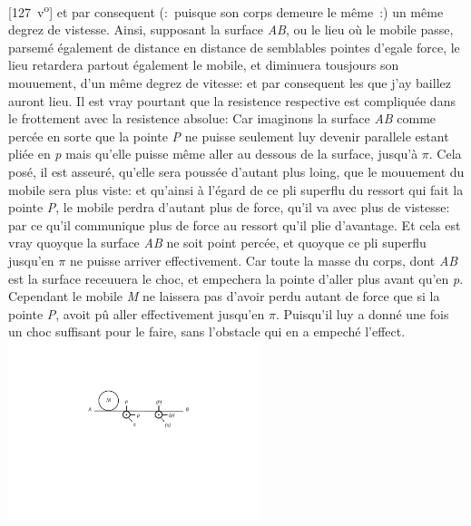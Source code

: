 [127~v\textsuperscript{o}] et par consequent (:~puisque son corps demeure le m\^{e}me~:) un m\^{e}me degrez de vistesse. Ainsi, supposant la surface \textit{AB}, ou le lieu o\`{u} le mobile passe, parsem\'{e} \'{e}galement de distance en distance de semblables pointes d'egale force, le lieu retardera partout \'{e}galement le mobile, et diminuera tousjours son mouuement, d'un m\^{e}me degrez de vitesse: et par consequent les  que j'ay baillez auront lieu.
\pend
\pstart
Il est vray pourtant que la resistence respective est compliqu\'{e}e dans le frottement avec la resistence absolue: Car imaginons la surface \textit{AB} comme perc\'{e}e en sorte que la pointe \textit{P} ne puisse seulement luy devenir parallele estant pli\'{e}e en \textit{p} mais qu'elle puisse m\^{e}me aller au dessous de la surface, jusqu'\`{a} $\pi$.
\pend
\pstart
Cela pos\'{e}, il est asseur\'{e}, qu'elle sera pouss\'{e}e d'autant plus loing, que le mouuement du mobile sera plus viste: et qu'ainsi \`{a} l'\'{e}gard de ce pli superflu du ressort qui fait la pointe \textit{P}, le mobile perdra d'autant plus de force, qu'il va avec plus de vistesse: par ce qu'il communique plus de force au ressort qu'il plie d'avantage. Et cela est vray quoyque la surface \textit{AB} ne soit point perc\'{e}e, et quoyque ce pli superflu jusqu'en $\pi$ ne puisse arriver effectivement. Car toute la masse du corps, dont \textit{AB} est la surface receuuera le choc, et empechera la pointe d'aller plus avant qu'en \textit{p}. Cependant le mobile \textit{M} ne laissera pas d'avoir perdu autant de force que si la pointe \textit{P}, avoit p\^{u} aller effectivement jusqu'en $\pi$. Puisqu'il luy a donn\'{e} une fois un choc suffisant pour le faire, sans l'obstacle qui en a empech\'{e} l'effect.
\pend
\vspace{1.5em}
\pstart
\noindent
\centering
    \includegraphics[trim = 0mm -3mm 0mm 0mm, clip, width=0.55\textwidth]{images/lh03705_127v-d1.pdf}
    \pend
    \pstart
    \noindent
{}%
\pend
\count{}
\count{}
\count{}